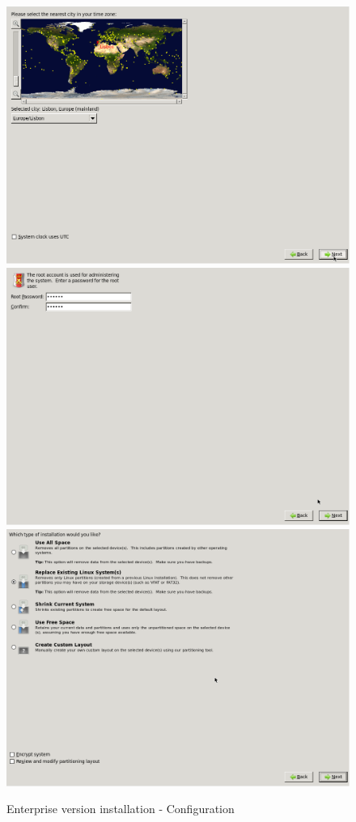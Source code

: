 \begin{figure}[H]
\begin{center}
	\includegraphics[scale=0.2]{screenshots/install/nuxis/wizard_install_05.png}
	\includegraphics[scale=0.2]{screenshots/install/nuxis/wizard_install_06.png}
	\includegraphics[scale=0.2]{screenshots/install/nuxis/wizard_install_07.png}
    \caption{Enterprise version installation - Configuration}
	\label{fig:installation_enterprise_03}
	\end{center}
\end{figure}
